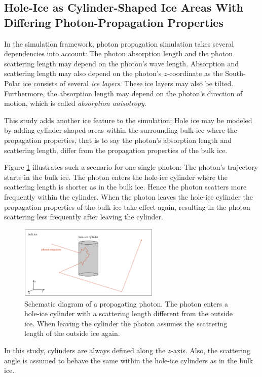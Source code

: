 
\subsection{Hole-Ice as Cylinder-Shaped Ice Areas With Differing Photon-Propagation Properties}

In the \icecube simulation framework, photon propagation simulation takes several dependencies into account: The photon absorption length and the photon scattering length may depend on the photon's wave length. Absorption and scattering length may also depend on the photon's $z$-coordinate as the South-Polar ice consists of several \textit{ice layers}. These ice layers may also be tilted. Furthermore, the absorption length may depend on the photon's direction of motion, which is called \textit{absorption anisotropy}.

This study adds another ice feature to the simulation: Hole ice may be modeled by adding cylinder-shaped areas within the surrounding bulk ice where the propagation properties, that is to say the photon's absorption length and scattering length, differ from the propagation properties of the bulk ice.

Figure \ref{fig:aiw2Thah} illustrates such a scenario for one single photon: The photon's trajectory starts in the bulk ice. The photon enters the hole-ice cylinder where the scattering length is shorter as in the bulk ice. Hence the photon scatters more frequently within the cylinder. When the photon leaves the hole-ice cylinder the propagation properties of the bulk ice take effect again, resulting in the photon scattering less frequently after leaving the cylinder.

\begin{figure}[htb]
  \centering
  \includegraphics[width=0.6\textwidth]{img/hole-ice-as-cylinder-shaped-areas}
  \caption{Schematic diagram of a propagating photon. The photon enters a hole-ice cylinder with a scattering length different from the outside ice. When leaving the cylinder the photon assumes the scattering length of the outside ice again.}
  \label{fig:aiw2Thah}
\end{figure}

In this study, cylinders are always defined along the $z$-axis. Also, the scattering angle is assumed to behave the same within the hole-ice cylinders as in the bulk ice.

